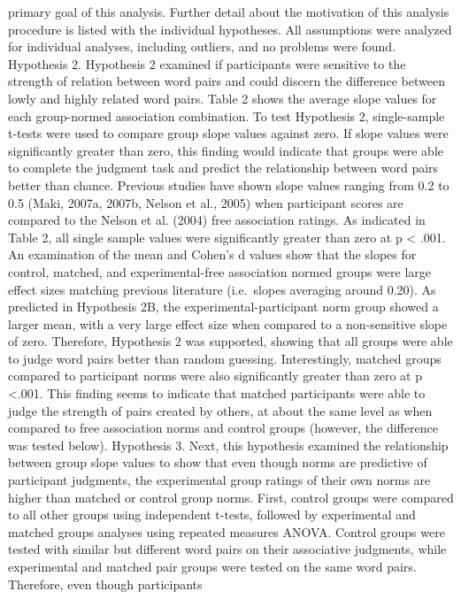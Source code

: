 \documentclass[english,man]{apa6}
\theoremstyle{definition}
\theoremstyle{definition}
\theoremstyle{definition}
\theoremstyle{remark}
\begin{document}
primary goal of this analysis. Further detail about the motivation of
this analysis procedure is listed with the individual hypotheses. All
assumptions were analyzed for individual analyses, including outliers,
and no problems were found. Hypothesis 2. Hypothesis 2 examined if
participants were sensitive to the strength of relation between word
pairs and could discern the difference between lowly and highly related
word pairs. Table 2 shows the average slope values for each group-normed
association combination. To test Hypothesis 2, single-sample t-tests
were used to compare group slope values against zero. If slope values
were significantly greater than zero, this finding would indicate that
groups were able to complete the judgment task and predict the
relationship between word pairs better than chance. Previous studies
have shown slope values ranging from 0.2 to 0.5 (Maki, 2007a, 2007b,
Nelson et al., 2005) when participant scores are compared to the Nelson
et al. (2004) free association ratings. As indicated in Table 2, all
single sample values were significantly greater than zero at p
\textless{} .001. An examination of the mean and Cohen's d values show
that the slopes for control, matched, and experimental-free association
normed groups were large effect sizes matching previous literature
(i.e.~slopes averaging around 0.20). As predicted in Hypothesis 2B, the
experimental-participant norm group showed a larger mean, with a very
large effect size when compared to a non-sensitive slope of zero.
Therefore, Hypothesis 2 was supported, showing that all groups were able
to judge word pairs better than random guessing. Interestingly, matched
groups compared to participant norms were also significantly greater
than zero at p \textless{}.001. This finding seems to indicate that
matched participants were able to judge the strength of pairs created by
others, at about the same level as when compared to free association
norms and control groups (however, the difference was tested below).
Hypothesis 3. Next, this hypothesis examined the relationship between
group slope values to show that even though norms are predictive of
participant judgments, the experimental group ratings of their own norms
are higher than matched or control group norms. First, control groups
were compared to all other groups using independent t-tests, followed by
experimental and matched groups analyses using repeated measures ANOVA.
Control groups were tested with similar but different word pairs on
their associative judgments, while experimental and matched pair groups
were tested on the same word pairs. Therefore, even though participants
\end{document}
